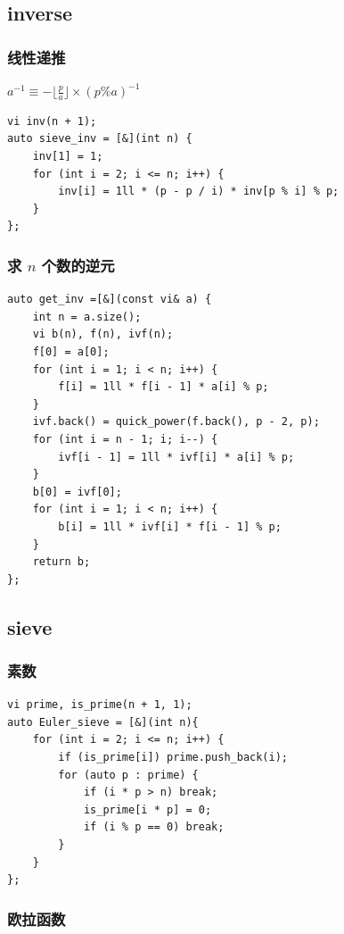 \documentclass[UTF8, a4paper, titlepage, twoside]{ctexart}
\begin{document}
\subsection{ inverse }
\subsubsection*{ 线性递推 }

$a^{-1} \equiv -\lfloor\frac{p}{a}\rfloor\times(p\%a)^{-1}$

\begin{lstlisting}[style=cpp]
vi inv(n + 1);
auto sieve_inv = [&](int n) {
    inv[1] = 1;
    for (int i = 2; i <= n; i++) {
        inv[i] = 1ll * (p - p / i) * inv[p % i] % p;
    }
};
\end{lstlisting}

\subsubsection*{ 求 $n$ 个数的逆元 }

\begin{lstlisting}[style=cpp]
auto get_inv =[&](const vi& a) {
    int n = a.size();
    vi b(n), f(n), ivf(n);
    f[0] = a[0];
    for (int i = 1; i < n; i++) {
        f[i] = 1ll * f[i - 1] * a[i] % p;
    }
    ivf.back() = quick_power(f.back(), p - 2, p);
    for (int i = n - 1; i; i--) {
        ivf[i - 1] = 1ll * ivf[i] * a[i] % p;
    }
    b[0] = ivf[0];
    for (int i = 1; i < n; i++) {
        b[i] = 1ll * ivf[i] * f[i - 1] % p;
    }
    return b;
};
\end{lstlisting}

\subsection{ sieve }

\subsubsection*{ 素数 }
\begin{lstlisting}[style=cpp]
vi prime, is_prime(n + 1, 1);
auto Euler_sieve = [&](int n){
    for (int i = 2; i <= n; i++) {
        if (is_prime[i]) prime.push_back(i);
        for (auto p : prime) {
            if (i * p > n) break;
            is_prime[i * p] = 0;
            if (i % p == 0) break;
        }
    }
};
\end{lstlisting}

\subsubsection*{ 欧拉函数 }
\end{document}
